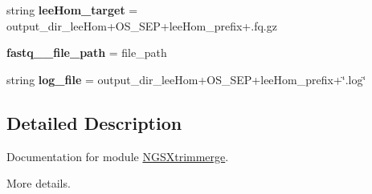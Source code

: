 \begin{DoxyCompactItemize}
\item 
string {\bfseries lee\+Hom\+\_\+target} = output\+\_\+dir\+\_\+lee\+Hom+O\+S\+\_\+\+S\+EP+lee\+Hom\+\_\+prefix+\textquotesingle{}.fq.\+gz\textquotesingle{}\hypertarget{namespaceNGSXtrimmerge_afa4ac1d6adbc295f6caf824af096312d}{}\label{namespaceNGSXtrimmerge_afa4ac1d6adbc295f6caf824af096312d}

\item 
{\bfseries fastq\+\_\+\_\+file\+\_\+path} = file\+\_\+path\hypertarget{namespaceNGSXtrimmerge_a2fd50e2f223e7d8d636a43b890ca2fbf}{}\label{namespaceNGSXtrimmerge_a2fd50e2f223e7d8d636a43b890ca2fbf}

\item 
string {\bfseries log\+\_\+file} = output\+\_\+dir\+\_\+lee\+Hom+O\+S\+\_\+\+S\+EP+lee\+Hom\+\_\+prefix+\char`\"{}.log\char`\"{}\hypertarget{namespaceNGSXtrimmerge_a912cf534ade9f91c0d9f1d95cedc05d0}{}\label{namespaceNGSXtrimmerge_a912cf534ade9f91c0d9f1d95cedc05d0}

\end{DoxyCompactItemize}


\subsection{Detailed Description}
Documentation for module \hyperlink{namespaceNGSXtrimmerge}{N\+G\+S\+Xtrimmerge}. 

More details. 